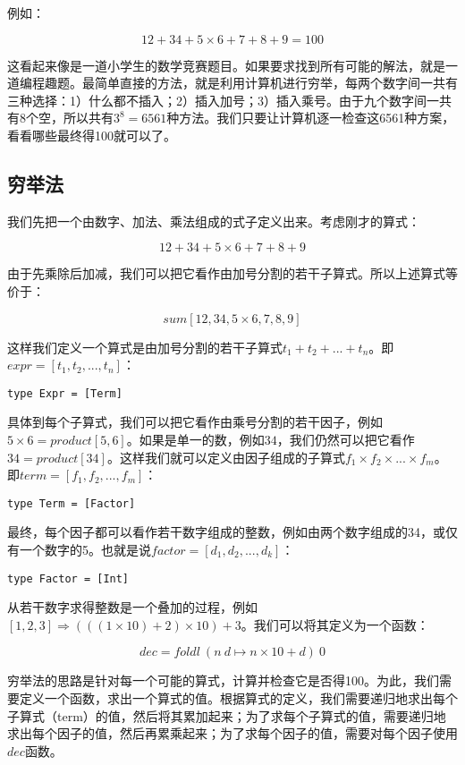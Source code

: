 \documentclass{article}
\begin{document}
例如：

\[
12 + 34 + 5 \times 6 + 7 + 8 + 9 = 100
\]

这看起来像是一道小学生的数学竞赛题目。如果要求找到所有可能的解法，就是一道编程趣题。最简单直接的方法，就是利用计算机进行穷举，每两个数字间一共有三种选择：1）什么都不插入；2）插入加号；3）插入乘号。由于九个数字间一共有8个空，所以共有$3^8 = 6561$种方法。我们只要让计算机逐一检查这6561种方案，看看哪些最终得100就可以了。

\subsection{穷举法}

我们先把一个由数字、加法、乘法组成的式子定义出来。考虑刚才的算式：

\[
12 + 34 + 5 \times 6 + 7 + 8 + 9
\]

由于先乘除后加减，我们可以把它看作由加号分割的若干子算式。所以上述算式等价于：

\[
sum [12, 34, 5 \times 6, 7, 8, 9]
\]

这样我们定义一个算式是由加号分割的若干子算式$t_1 + t_2 + ... + t_n$。即$expr = [t_1, t_2, ..., t_n]$：

\lstset{frame = none}
\begin{lstlisting}
type Expr = [Term]
\end{lstlisting}

具体到每个子算式，我们可以把它看作由乘号分割的若干因子，例如$5 \times 6 = product [5, 6]$。如果是单一的数，例如$34$，我们仍然可以把它看作$34 = product [34]$。这样我们就可以定义由因子组成的子算式$f_1 \times f_2 \times ... \times f_m$。即$term = [f_1, f_2, ..., f_m]$：

\begin{lstlisting}
type Term = [Factor]
\end{lstlisting}

最终，每个因子都可以看作若干数字组成的整数，例如由两个数字组成的34，或仅有一个数字的5。也就是说$factor = [d_1, d_2, ..., d_k]$：

\begin{lstlisting}
type Factor = [Int]
\end{lstlisting}

从若干数字求得整数是一个叠加的过程，例如$[1, 2, 3] \Rightarrow (((1 \times 10) + 2) \times 10) + 3$。我们可以将其定义为一个函数：

\[
dec = foldl\ (n\ d \mapsto n \times 10 + d)\ 0
\]

穷举法的思路是针对每一个可能的算式，计算并检查它是否得100。为此，我们需要定义一个函数，求出一个算式的值。根据算式的定义，我们需要递归地求出每个子算式（term）的值，然后将其累加起来；为了求每个子算式的值，需要递归地求出每个因子的值，然后再累乘起来；为了求每个因子的值，需要对每个因子使用$dec$函数。
\end{document}
